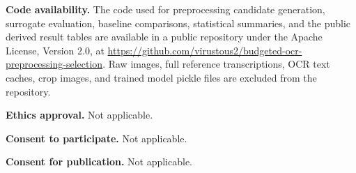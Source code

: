 \documentclass[pdflatex,sn-basic,Numbered,iicol]{sn-jnl}
\begin{document}
\textbf{Code availability.} The code used for preprocessing candidate generation, surrogate evaluation, baseline comparisons, statistical summaries, and the public derived result tables are available in a public repository under the Apache License, Version 2.0, at \url{https://github.com/virustous2/budgeted-ocr-preprocessing-selection}. Raw images, full reference transcriptions, OCR text caches, crop images, and trained model pickle files are excluded from the repository.

\textbf{Ethics approval.} Not applicable.

\textbf{Consent to participate.} Not applicable.

\textbf{Consent for publication.} Not applicable.


\end{document}
